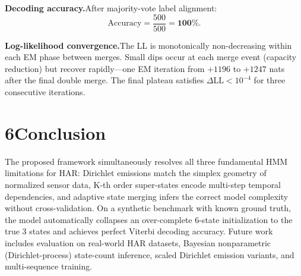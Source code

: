\documentclass[10pt,a4paper,twocolumn]{article}
\begin{document}
\textbf{Decoding accuracy.}\enspace After majority-vote label alignment:
\[
  \mathrm{Accuracy}=\frac{500}{500}=\mathbf{100\%}.
\]

\textbf{Log-likelihood convergence.}\enspace The LL is monotonically non-decreasing within each EM phase between merges.
Small dips occur at each merge event (capacity reduction) but recover rapidly---one EM iteration from $+1196$ to $+1247$ nats after the final double merge.
The final plateau satisfies $\Delta\!\mathrm{LL}<10^{-4}$ for three consecutive iterations.

\section*{6\enspace Conclusion}

The proposed framework simultaneously resolves all three fundamental HMM limitations for HAR: Dirichlet emissions match the simplex geometry of normalized sensor data, K-th order super-states encode multi-step temporal dependencies, and adaptive state merging infers the correct model complexity without cross-validation.
On a synthetic benchmark with known ground truth, the model automatically collapses an over-complete 6-state initialization to the true 3 states and achieves perfect Viterbi decoding accuracy.
Future work includes evaluation on real-world HAR datasets, Bayesian nonparametric (Dirichlet-process) state-count inference, scaled Dirichlet emission variants, and multi-sequence training.
\end{document}
